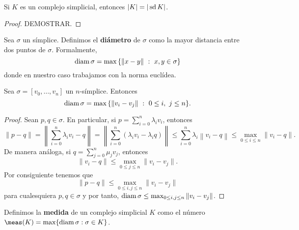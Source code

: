 \begin{proposicion}
	Si $K$ es un complejo simplicial, entonces $|K| = |\operatorname{sd} K|$.
\end{proposicion}
\begin{proof}
	DEMOSTRAR.
\end{proof}

\begin{definicion}
	Sea $\sigma$ un símplice. Definimos el \textbf{diámetro} de $\sigma$ como la mayor distancia entre dos puntos de $\sigma$. Formalmente,
	\[
		\diam \sigma = \max{\{\|x-y\|\ :\ x,y \in \sigma\}}
	\]
	donde en nuestro caso trabajamos con la norma euclídea.
\end{definicion}
\begin{lema}
	\label{lem:char-diam}
	Sea $\sigma = [v_0, \dots, v_n]$ un $n$-símplice. Entonces
	\[
		\diam \sigma = \max{\{\|v_i-v_j\|\ :\ 0 \leq i,\ j \leq n\}}.
	\]
\end{lema}
\begin{proof}
	Sean $p,q \in \sigma$. En particular, si $p = \sum_{i=0}^{n} \lambda_i v_i$, entonces
	\[
		\|p-q\|=\left\|\sum_{i=0}^{n} \lambda _ {i} v_{i} - q\right\|=\left\| \sum _{i=0}^{n}(\lambda _{i} v_{i} - \lambda_{i} q)\right\| \leq \sum_{i=0}^{n} \lambda_{i} \left\|v_{i}-q\right\| \leq \max_{0 \leq i \leq n} \|v_{i} - q\|.
	\]
	De manera análoga, si $q = \sum_{j=0}^{n} \mu_j v_j$, entonces
	\[
	\|v_i - q\| \leq \max_{0 \leq j \leq n} \|v_i -v_j\|.
	\]
	Por consiguiente tenemos que \[\|p-q\| \leq \max_{0\leq i, j\leq n}\|v_i-v_j\|\] para cualesquiera $p,q \in \sigma$ y por tanto, $\operatorname{diam} \sigma \leq \max_{0\leq i, j\leq n}\|v_i-v_j\|$.
\end{proof}

\begin{definicion}
	Definimos la \textbf{medida} de un complejo simplicial $K$ como el número $\meas (K) = \max \{\diam \sigma : \sigma \in K\}$.
\end{definicion}

